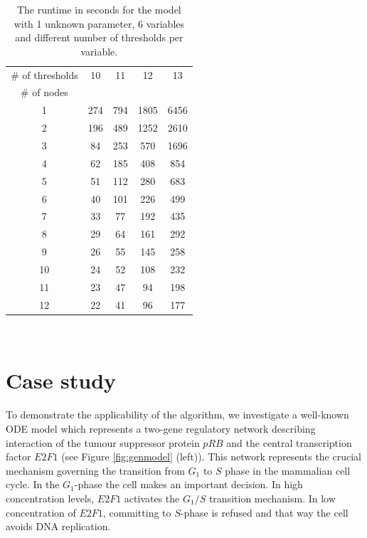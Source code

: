 \documentclass[12pt,oneside]{fithesis2}
\begin{document}
			\begin{table}
				\centering
				\setlength{\tabcolsep}{6pt}
				\begin{tabular}{|*{5}{c|}}
					\hline
						\# of thresholds & 10 & 11 & 12 & 13 \\
						\cline{1-1}
						\# of nodes & & & & \\
					\hline
						1 &	274 &	794 &	1805 &	6456 \\
						2 &	196 &	489 &	1252 &	2610 \\
						3 &	84 &	253 &	570 &	1696 \\
						4 &	62 &	185 &	408 &	 854 \\
						5 &	51 &	112 &	280 & 683 \\
						6 &	40 &	101 &	226 &	499 \\
						7 &	33 &	77 &	192 &	435 \\
						8 &	29 &	64 &	161 &	292 \\
						9 &	26 &	55 &	145 &	258 \\
						10 &	24 &	52 &	108 &	232 \\
						11 &	23 &	47 &	94 &	198 \\
						12 & 22	 & 41	 & 96	&	177 \\
					\hline
				\end{tabular}\\[1em]
				\caption{The runtime in seconds for the model with 1 unknown parameter, 6 variables and different number of thresholds per variable.}
			\end{table}

			\newpage
						\newpage
									\newpage			\newpage
			\section{Case study}
				\label{sec:case}
			
				To demonstrate the applicability of the algorithm, we investigate a well-known ODE model \cite{bifurcation} which represents a two-gene regulatory network describing interaction of the tumour suppressor protein $pRB$ and the central transcription factor $E2F1$ (see Figure \ref{fig:genmodel} (left)). This network represents the crucial mechanism governing the transition from $G_1$ to $S$ phase in the mammalian cell cycle. In the $G_1$-phase the cell makes an important decision. In high concentration levels, $E2F1$ activates the $G_1/S$ transition mechanism. In low concentration of $E2F1$, committing to $S$-phase is refused and that way the cell avoids DNA replication.
				
\end{document}
